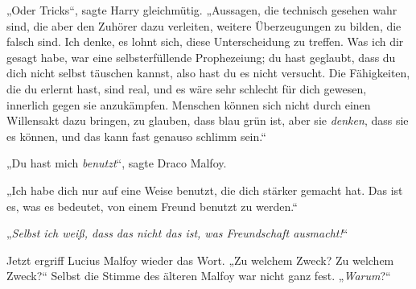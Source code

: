 „Oder Tricks“, sagte Harry gleichmütig.
„Aussagen, die technisch gesehen wahr sind, die aber den Zuhörer dazu verleiten, weitere Überzeugungen zu bilden, die falsch sind. Ich denke, es lohnt sich, diese Unterscheidung zu treffen. Was ich dir gesagt habe, war eine selbsterfüllende Prophezeiung; du hast geglaubt, dass du dich nicht selbst täuschen kannst, also hast du es nicht versucht. Die Fähigkeiten, die du erlernt hast, sind real, und es wäre sehr schlecht für dich gewesen, innerlich gegen sie anzukämpfen. Menschen können sich nicht durch einen Willensakt dazu bringen, zu glauben, dass blau grün ist, aber sie \emph{denken}, dass sie es können, und das kann fast genauso schlimm sein.“

„Du hast mich \emph{benutzt}“, sagte Draco Malfoy.

„Ich habe dich nur auf eine Weise benutzt, die dich stärker gemacht hat. Das ist es, was es bedeutet, von einem Freund benutzt zu werden.“

„\emph{Selbst ich weiß, dass das nicht das ist, was Freundschaft ausmacht!}“

Jetzt ergriff Lucius Malfoy wieder das Wort.
„Zu welchem Zweck? Zu welchem Zweck?“
Selbst die Stimme des älteren Malfoy war nicht ganz fest.
„\emph{Warum}?“


